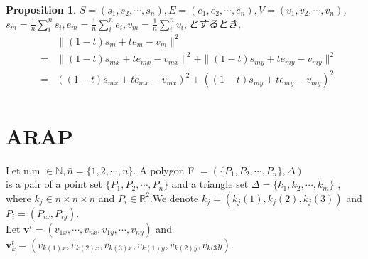 \documentclass[8pt]{article}
\newtheorem{prop}{\bf Proposition}
\begin{document}
\begin{prop}
$S = (s_1,s_2,\cdots ,s_n),E = (e_1,e_2, \cdots ,e_n),V = (v_1,v_2,\cdots,v_n)$,\\
$s_m = \displaystyle \frac{1}{n}  \sum^n_{i}s_i,e_m = \frac{1}{n} \displaystyle \sum^n_{i}e_i,v_m = \frac{1}{n} \displaystyle \sum^n_{i}v_i,$とするとき,\\
\begin{eqnarray*}
&&\|(1-t)s_m + t e_m - v_m\|^2 \\
&=& \|(1-t)s_{mx} + t e_{mx} - v_{mx}\|^2 + \|(1-t)s_{my} + t e_{my} - v_{my}\|^2 \\
&=&((1-t)s_{mx} + t e_{mx} - v_{mx})^2 + ((1-t)s_{my} + t e_{my} - v_{my})^2\\
\end{eqnarray*}
\end{prop}

\section{ARAP}

Let n,m $ \in \mathbb{N} ,\bar{n} = \{ 1,2, \cdots ,n \}.$ A polygon F $ = ( \{P_1,P_2, \cdots ,P_n\}, \Delta  ) $ \\
is a pair of a point set  $\{ P_1,P_2, \cdots ,P_n\}$ and a triangle set $ \Delta = \{ k_1,k_2, \cdots ,k_m\} $ ,\\
where $ k_j \in \bar{n} \times \bar{n} \times\bar{n}$ and $ P_i \in \mathbb{R}^2$.We denote $k_j = (k_j(1),k_j(2),k_j(3))$  and  $P_i = (P_{ix},P_{iy}).$\\
Let $\mathbf{v}^t = (v_{1x}, \cdots ,v_{nx},v_{1y}, \cdots ,v_{ny})$ and $\mathbf{v}_k^t = (v_{k(1)x},v_{k(2)x},v_{k(3)x},v_{k(1)y},v_{k(2)y},v_{k(3}y)$. \\
\end{document}
